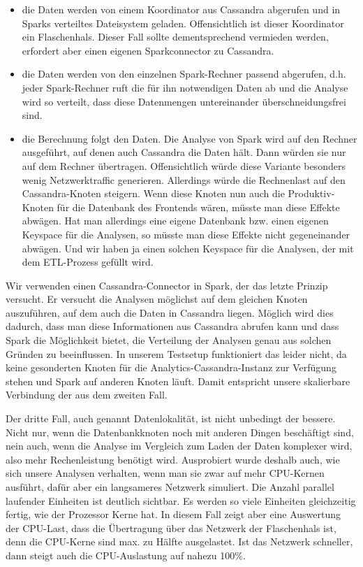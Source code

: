 \begin{itemize}
\item die Daten werden von einem Koordinator aus Cassandra abgerufen und
in Sparks verteiltes Dateisystem geladen. Offensichtlich ist dieser
Koordinator ein Flaschenhals. Dieser Fall sollte dementsprechend
vermieden werden, erfordert aber einen eigenen Sparkconnector zu
Cassandra.
\item die Daten werden von den einzelnen Spark-Rechner passend
abgerufen, d.h. jeder Spark-Rechner ruft die für ihn notwendigen Daten
ab und die Analyse wird so verteilt, dass diese Datenmengen
untereinander überschneidungsfrei sind.
\item die Berechnung folgt den Daten. Die Analyse von Spark wird auf den
Rechner ausgeführt, auf denen auch Cassandra die Daten hält. Dann
würden sie nur auf dem Rechner übertragen. Offensichtlich würde diese
Variante besonders wenig Netzwerktraffic generieren. Allerdings würde
die Rechnenlast auf den Cassandra-Knoten steigern. Wenn diese Knoten
nun auch die Produktiv-Knoten für die Datenbank des Frontends wären,
müsste man diese Effekte abwägen. Hat man allerdings eine eigene
Datenbank bzw. einen eigenen Keyspace für die Analysen, so müsste man
diese Effekte nicht gegeneinander abwägen. Und wir haben ja einen
solchen Keyspace für die Analysen, der mit dem ETL-Prozess gefüllt wird.
\end{itemize}
Wir verwenden einen Cassandra-Connector in Spark, der das letzte Prinzip
versucht. Er versucht die Analysen möglichst auf dem gleichen Knoten
auszuführen, auf dem auch die Daten in Cassandra liegen. Möglich wird
dies dadurch, dass man diese Informationen aus Cassandra abrufen kann
und dass Spark die Möglichkeit bietet, die Verteilung der Analysen
genau aus solchen Gründen zu beeinflussen. In unserem Testsetup
funktioniert das leider nicht, da keine gesonderten Knoten für die
Analytics-Cassandra-Instanz zur Verfügung stehen und Spark auf anderen
Knoten läuft. Damit entspricht unsere skalierbare Verbindung der aus
dem zweiten Fall.

Der dritte Fall, auch genannt Datenlokalität, ist nicht unbedingt der
bessere. Nicht nur, wenn die Datenbankknoten noch mit anderen Dingen
beschäftigt sind, nein auch, wenn die Analyse im Vergleich zum Laden
der Daten komplexer wird, also mehr Rechenleistung benötigt wird.
Ausprobiert wurde deshalb auch, wie sich unsere Analysen verhalten,
wenn man sie zwar auf mehr CPU-Kernen ausführt, dafür aber ein
langsameres Netzwerk simuliert. Die Anzahl parallel laufender Einheiten
ist deutlich sichtbar. Es werden so viele Einheiten gleichzeitig
fertig, wie der Prozessor Kerne hat. In diesem Fall zeigt aber eine
Auswertung der CPU-Last, dass die Übertragung über das Netzwerk der
Flaschenhals ist, denn die CPU-Kerne sind max. zu Hälfte ausgelastet.
Ist das Netzwerk schneller, dann steigt auch die CPU-Auslastung auf
nahezu 100\%.


